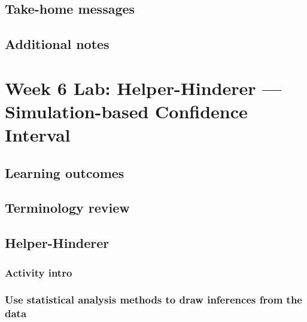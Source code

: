 \documentclass[
]{report}
\begin{document}
\hypertarget{take-home-messages-9}{%
\subsection{Take-home messages}\label{take-home-messages-9}}

\hypertarget{additional-notes-8}{%
\subsection{Additional notes}\label{additional-notes-8}}

\hypertarget{week-6-lab-helper-hinderer-simulation-based-confidence-interval}{%
\section{Week 6 Lab: Helper-Hinderer --- Simulation-based Confidence Interval}\label{week-6-lab-helper-hinderer-simulation-based-confidence-interval}}

\hypertarget{learning-outcomes-11}{%
\subsection{Learning outcomes}\label{learning-outcomes-11}}

\hypertarget{terminology-review-9}{%
\subsection{Terminology review}\label{terminology-review-9}}

\hypertarget{helper-hinderer-2}{%
\subsection{Helper-Hinderer}\label{helper-hinderer-2}}

\hypertarget{activity-intro}{%
\subsubsection*{Activity intro}\label{activity-intro}}

\hypertarget{use-statistical-analysis-methods-to-draw-inferences-from-the-data-1}{%
\subsubsection*{Use statistical analysis methods to draw inferences from the data}\label{use-statistical-analysis-methods-to-draw-inferences-from-the-data-1}}
\end{document}
